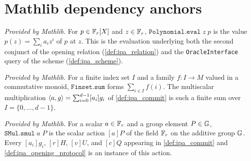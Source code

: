 \section{Mathlib dependency anchors}

\begin{definition}
  \label{def:mathlib_poly_eval}
  \mathlibok
  \textit{Provided by Mathlib.}
  For \(p \in \mathbb{F}_r[X]\) and \(z \in \mathbb{F}_r\), \(\texttt{Polynomial.eval}\;z\;p\) is
  the value \(p(z) = \sum_{i} a_{i} z^{i}\) of \(p\) at \(z\). This is the
  evaluation underlying both the second conjunct of the opening relation
  (\cref{def:ipa_relation}) and the \texttt{OracleInterface} query of the scheme
  (\cref{def:ipa_scheme}).
\end{definition}

\begin{definition}
  \label{def:mathlib_finsum}
  \mathlibok
  \textit{Provided by Mathlib.}
  For a finite index set \(I\) and a family \(f : I \to M\) valued in a
  commutative monoid, \(\texttt{Finset.sum}\) forms \(\sum_{i \in I} f(i)\). The
  multiscalar multiplication \(\langle a, g \rangle = \sum_{i=0}^{d-1} [a_{i}] g_{i}\) of
  \cref{def:ipa_commit} is such a finite sum over \(I = \{0, \dots, d-1\}\).
\end{definition}

\begin{definition}
  \label{def:mathlib_module_smul}
  \mathlibok
  \textit{Provided by Mathlib.}
  For a scalar \(a \in \mathbb{F}_r\) and a group element \(P \in \mathbb{G}\),
  \(\texttt{SMul.smul}\;a\;P\) is the scalar action \([a]P\) of the field \(\mathbb{F}_r\)
  on the additive group \(\mathbb{G}\). Every \([a_{i}]g_{i}\), \([r]H\),
  \([v]U\), and \([c]Q\) appearing in \cref{def:ipa_commit} and
  \cref{def:ipa_opening_protocol} is an instance of this action.
\end{definition}
